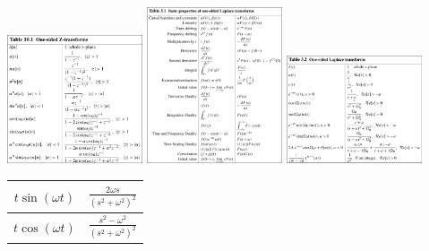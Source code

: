 \documentclass[12pt,landscape,letterpaper]{article}
\begin{document}
\begin{multicols*}{3}
	\includegraphics[width=0.3\textwidth]{zXform-pairs}
	\includegraphics[width=0.3\textwidth]{laplace-properties}
	\includegraphics[width=0.3\textwidth]{laplace-pairs}
	\begin{tabular}{|c|c|}
		\hline
		$t\sin(\omega t)$ & $\frac{2\omega s}{(s^2 + \omega ^2)^2}$\\
		\hline
		$t\cos(\omega t)$ & $\frac{s^2 - \omega ^2}{(s^2 + \omega ^2)^2}$\\
		\hline
	\end{tabular}
\end{multicols*}
\newpage
\end{document}
